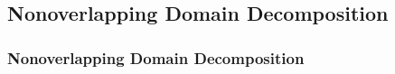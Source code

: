 \documentclass[aspectratio=169,11pt]{beamer}
\theoremstyle{definition}
\begin{document}
\subsection{Nonoverlapping Domain Decomposition}
\begin{frame}
  \frametitle<presentation>{Nonoverlapping Domain Decomposition}

  \begin{columns}
    \begin{column}{0.6\linewidth}


\end{column}
\end{columns}
\end{frame}
\end{document}

